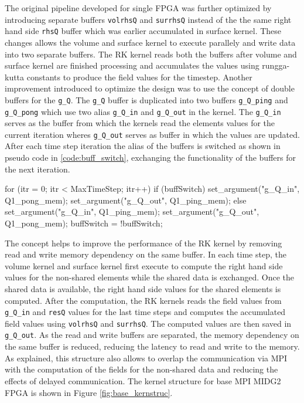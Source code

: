 The original pipeline developed for single FPGA was further optimized by introducing separate buffers
\texttt{volrhsQ} and \texttt{surrhsQ} instead of the the same right hand side \texttt{rhsQ} buffer
which was earlier accumulated in surface kernel. These changes allows the volume and surface kernel
to execute parallely and write data into two separate buffers. The RK kernel reads both the buffers
after volume and surface kernel are finished processing and accumulates the values using rungga-kutta
constants to produce the field values for the timestep. Another improvement introduced to optimize the
design was to use the concept of double buffers for the \texttt{g\_Q}. The \texttt{g\_Q} buffer is
duplicated into two buffers \texttt{g\_Q\_ping} and \texttt{g\_Q\_pong} which use two alias \texttt{g\_Q\_in}
and \texttt{g\_Q\_out} in the kernel. The \texttt{g\_Q\_in} serves as the buffer from which the kernels read
the elements values for the current iteration wheres \texttt{g\_Q\_out} serves as buffer in which the values
are updated. After each time step iteration the alias of the buffers is switched as shown
in pseudo code in \ref{code:buff_switch}, exchanging the functionality of the buffers for the next iteration.

\begin{CppCode}[caption=Buffer switching for double buffers in each iteration, frame=tlrb, label=code:buff_switch]
for (itr = 0; itr < MaxTimeStep; itr++)
{
    if (buffSwitch)
    {
        set_argument("g_Q_in", Q1_pong_mem);
        set_argument("g_Q_out", Q1_ping_mem);
    }
    else
    {
        set_argument("g_Q_in", Q1_ping_mem);
        set_argument("g_Q_out", Q1_pong_mem);
    }
    buffSwitch = !buffSwitch;
}
\end{CppCode}

The concept helps to improve the performance of the RK kernel
by removing read and write memory dependency on the same buffer. In each time step,
the volume kernel and surface kernel first execute to compute the right hand side values for the
non-shared elements while the shared data is exchanged. Once the shared data is available,
the right hand side values for the shared elements is computed. After the computation,
the RK kernels reads the field values from \texttt{g\_Q\_in} and \texttt{resQ} values
for the last time steps and computes the accumulated field values using
\texttt{volrhsQ} and \texttt{surrhsQ}. The computed values are then saved in \texttt{g\_Q\_out}.
As the read and write buffers are separated, the memory dependency on the same buffer is reduced,
reducing the latency to read and write to the memory. As explained, this structure also allows
to overlap the communication via MPI with the computation of the fields for the non-shared data
and reducing the effects of delayed communication. The kernel structure for base MPI MIDG2 FPGA
is shown in Figure \ref{fig:base_kernstruc}.

